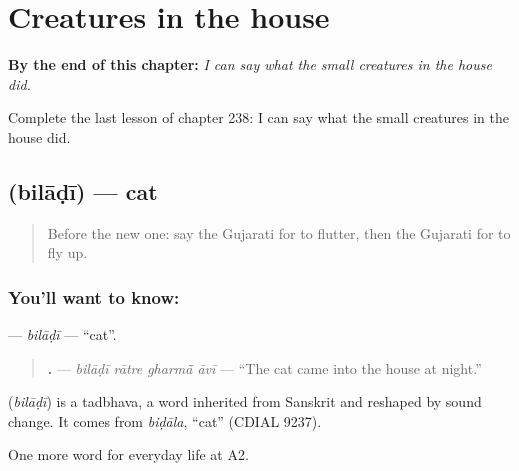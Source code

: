 
\chapter{Creatures in the house}
\label{ch:gu-creatures-in-the-house}

\begin{chapteropening}
\textbf{By the end of this chapter:} \emph{I can say what the small creatures in the house did.}

Complete the last lesson of chapter 238: I can say what the small creatures in the house did.
\end{chapteropening}

\section[\texorpdfstring{\gu{બિલાડી} (bilāḍī)}{બિલાડી (bilāḍī)}]{ (bilāḍī) — cat}

\label{lesson:GU-C238-biladi}



\begin{quote}
Before the new one: say the Gujarati for to flutter, then the Gujarati for to fly up.
\end{quote}

\subsection*{You'll want to know: }
\textbf{} — \emph{bilāḍī} — \textquotedblleft{}cat\textquotedblright{}.

\begin{quote}
\textbf{   .} — \emph{bilāḍī rātre gharmā̃ āvī} — \textquotedblleft{}The cat came into the house at night.\textquotedblright{}
\end{quote}

\begin{cousinweb}
\textbf{} (\emph{bilāḍī}) is a tadbhava, a word inherited from Sanskrit and reshaped by sound change. It comes from \emph{biḍāla}, \textquotedblleft{}cat\textquotedblright{} (CDIAL 9237).
\end{cousinweb}

\begin{grammarlens}[title={What you've built}]
One more word for everyday life at A2.
\end{grammarlens}

